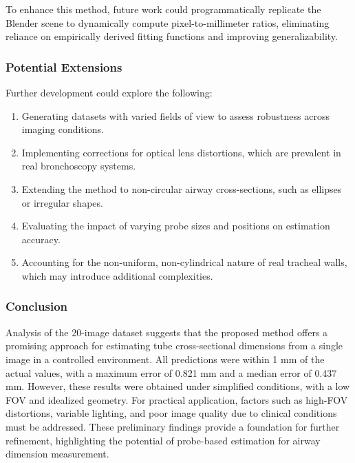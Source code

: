 To enhance this method, future work could programmatically replicate the Blender scene to dynamically compute pixel-to-millimeter ratios, eliminating reliance on empirically derived fitting functions and improving generalizability.

\subsubsection{Potential Extensions}
Further development could explore the following:
\begin{enumerate}
    \item Generating datasets with varied fields of view to assess robustness across imaging conditions.
    \item Implementing corrections for optical lens distortions, which are prevalent in real bronchoscopy systems.
    \item Extending the method to non-circular airway cross-sections, such as ellipses or irregular shapes.
    \item Evaluating the impact of varying probe sizes and positions on estimation accuracy.
    \item Accounting for the non-uniform, non-cylindrical nature of real tracheal walls, which may introduce additional complexities.
\end{enumerate}

\subsubsection{Conclusion}

Analysis of the 20-image dataset suggests that the proposed method offers a promising approach for estimating tube cross-sectional dimensions from a single image in a controlled environment. All predictions were within 1 mm of the actual values, with a maximum error of 0.821 mm and a median error of 0.437 mm. However, these results were obtained under simplified conditions, with a low FOV and idealized geometry. For practical application, factors such as high-FOV distortions, variable lighting, and poor image quality due to clinical conditions must be addressed. These preliminary findings provide a foundation for further refinement, highlighting the potential of probe-based estimation for airway dimension measurement.


